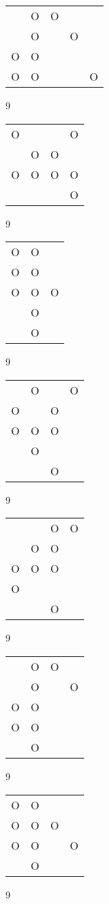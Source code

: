 \begin{tabular}{|m{0.2cm}m{0.2cm}m{0.2cm}m{0.2cm}m{0.2cm}|}\hline
 &O&O& & \\
 &O& &O& \\
O&O& & & \\
O&O& & &O\\
\hline\end{tabular}9
\begin{tabular}{|m{0.2cm}m{0.2cm}m{0.2cm}m{0.2cm}|}\hline
O& & &O\\
 &O&O& \\
O&O&O&O\\
 & & &O\\
\hline\end{tabular}9
\begin{tabular}{|m{0.2cm}m{0.2cm}m{0.2cm}|}\hline
O&O& \\
O&O& \\
O&O&O\\
 &O& \\
 &O& \\
\hline\end{tabular}9
\begin{tabular}{|m{0.2cm}m{0.2cm}m{0.2cm}m{0.2cm}|}\hline
 &O& &O\\
O& &O& \\
O&O&O& \\
 &O& & \\
 & &O& \\
\hline\end{tabular}9
\begin{tabular}{|m{0.2cm}m{0.2cm}m{0.2cm}m{0.2cm}|}\hline
 & &O&O\\
 &O&O& \\
O&O&O& \\
O& & & \\
 & &O& \\
\hline\end{tabular}9
\begin{tabular}{|m{0.2cm}m{0.2cm}m{0.2cm}m{0.2cm}|}\hline
 &O&O& \\
 &O& &O\\
O&O& & \\
O&O& & \\
 &O& & \\
\hline\end{tabular}9
\begin{tabular}{|m{0.2cm}m{0.2cm}m{0.2cm}m{0.2cm}|}\hline
O&O& & \\
O&O&O& \\
O&O& &O\\
 &O& & \\
\hline\end{tabular}9
